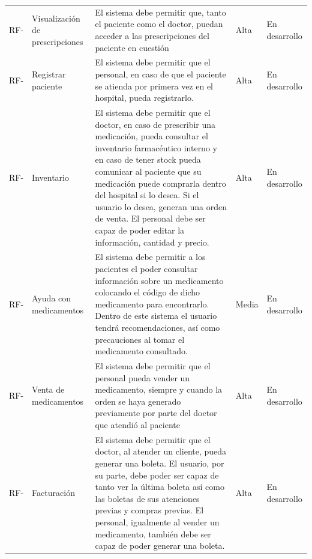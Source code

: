 \documentclass[10pt]{article}
\newlength{\x}
\newcounter{nIDR}
\newcommand\nIDR{\addtocounter{nIDR}{1}\thenIDR}
\newcommand\IDR{\centering \cellcolor{gris0} \textbf{\nIDR}}
\begin{document}
\begin{center}
\begin{longtable}{| m{0.07\x} m{0.15\x} m{0.48\x} m{0.12\x} m{0.14\x} |}
        \centering RF-\IDR & 
        \centering Visualización de prescripciones&
        El sistema debe permitir que, tanto el paciente como el doctor, puedan acceder a las prescripciones del paciente en cuestión &
        \centering Alta&
        En desarrollo\\
        
        \centering RF-\IDR & 
        \centering Registrar paciente&
        El sistema debe permitir que el personal, en caso de que el paciente se atienda por primera vez en el hospital, pueda registrarlo.&
        \centering Alta&
        En desarrollo\\

        \centering RF-\IDR & 
        \centering Inventario&
        El sistema debe permitir que el doctor, en caso de prescribir una medicación, pueda consultar el inventario farmacéutico interno y en caso de tener stock pueda comunicar al paciente que su medicación puede comprarla dentro del hospital si lo desea. Si el usuario lo desea, generan una orden de venta. El personal debe ser capaz de poder editar la información, cantidad y precio.&
        \centering Alta&
        En desarrollo\\

        \centering RF-\IDR & 
        \centering Ayuda con medicamentos&
        El sistema debe permitir a los pacientes el poder consultar información sobre un medicamento colocando el código de dicho medicamento para encontrarlo. Dentro de este sistema el usuario tendrá recomendaciones, así como precauciones al tomar el medicamento consultado.&
        \centering Media&
        En desarrollo\\

        \centering RF-\IDR & 
        \centering Venta de medicamentos&
        El sistema debe permitir que el personal pueda vender un medicamento, siempre y cuando la orden se haya generado previamente por parte del doctor que atendió al paciente&
        \centering Alta&
        En desarrollo\\

         \centering RF-\IDR & 
        \centering Facturación&
        El sistema debe permitir que el doctor, al atender un cliente, pueda generar una boleta. El usuario, por su parte, debe poder ser capaz de tanto ver la última boleta así como las boletas de sus atenciones previas y compras previas. El personal, igualmente al vender un medicamento, también debe ser capaz de poder generar una boleta.&
        \centering Alta&
        En desarrollo\\
        
             
%        

    \hline
\end{longtable}
\end{center}
\end{document}
